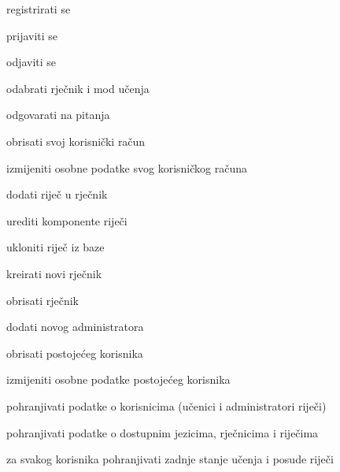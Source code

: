 			
			\begin{packed_enum}
				\item  {}
				
				\begin{packed_enum}
					
					\item registrirati se
					\item prijaviti se
					\item odjaviti se
%						
%				
					\item odabrati rječnik i mod učenja
					\item odgovarati na pitanja
					\item obrisati svoj korisnički račun
					\item izmijeniti osobne podatke svog korisničkog računa
					
				\end{packed_enum}
			
				\item  {}
				
				\begin{packed_enum}
					
					\item dodati riječ u rječnik
					\item urediti komponente riječi
					\item ukloniti riječ iz baze
					\item kreirati novi rječnik
					\item obrisati rječnik
					\item dodati novog administratora
					\item obrisati postojećeg korisnika
					\item izmijeniti osobne podatke postojećeg korisnika
										
				\end{packed_enum}
				
				\item  {}
				
				\begin{packed_enum}
					
					\item pohranjivati podatke o korisnicima (učenici i administratori riječi)
					\item pohranjivati podatke o dostupnim jezicima, rječnicima i riječima
					\item za svakog korisnika pohranjivati zadnje stanje učenja i posude riječi
					

\end{packed_enum}
\end{packed_enum}
